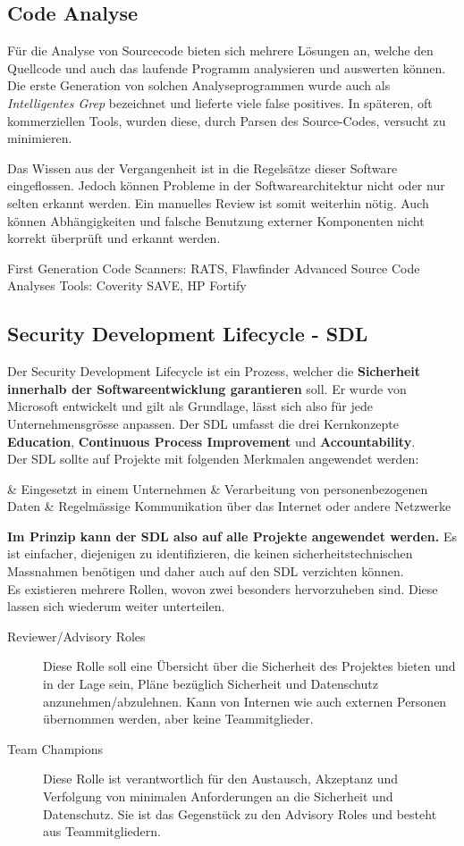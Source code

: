 \subsection{Code Analyse}

Für die Analyse von Sourcecode bieten sich mehrere Lösungen an, welche den Quellcode und auch das laufende Programm analysieren und auswerten können. Die erste Generation von solchen Analyseprogrammen wurde auch als \textit{Intelligentes Grep} bezeichnet und lieferte viele false positives. In späteren, oft kommerziellen Tools, wurden diese, durch Parsen des Source-Codes, versucht zu minimieren.

Das Wissen aus der Vergangenheit ist in die Regelsätze dieser Software eingeflossen. Jedoch können Probleme in der Softwarearchitektur nicht oder nur selten erkannt werden. Ein manuelles Review ist somit weiterhin nötig. Auch können Abhängigkeiten und falsche Benutzung externer Komponenten nicht korrekt überprüft und erkannt werden.

First Generation Code Scanners: RATS, Flawfinder
Advanced Source Code Analyses Tools: Coverity SAVE, HP Fortify

\subsection{Security Development Lifecycle - SDL}

Der Security Development Lifecycle ist ein Prozess, welcher die \textbf{Sicherheit innerhalb der Softwareentwicklung garantieren} soll. Er wurde von Microsoft entwickelt und gilt als Grundlage, lässt sich also für jede Unternehmensgrösse anpassen. Der SDL umfasst die drei Kernkonzepte \textbf{Education}, \textbf{Continuous Process Improvement} und \textbf{Accountability}.\\
Der SDL sollte auf Projekte mit folgenden Merkmalen angewendet werden:
\begin{easylist}[itemize]
	& Eingesetzt in einem Unternehmen
	& Verarbeitung von personenbezogenen Daten
	& Regelmässige Kommunikation über das Internet oder andere Netzwerke
\end{easylist}
\textbf{Im Prinzip kann der SDL also auf alle Projekte angewendet werden.} Es ist einfacher, diejenigen zu identifizieren, die keinen sicherheitstechnischen Massnahmen benötigen und daher auch auf den SDL verzichten können.\\
Es existieren mehrere Rollen, wovon zwei besonders hervorzuheben sind. Diese lassen sich wiederum weiter unterteilen.
\begin{description}
	\item[Reviewer/Advisory Roles] Diese Rolle soll eine Übersicht über die Sicherheit des Projektes bieten und in der Lage sein, Pläne bezüglich Sicherheit und Datenschutz anzunehmen/abzulehnen. Kann von Internen wie auch externen Personen übernommen werden, aber keine Teammitglieder.
	\item[Team Champions] Diese Rolle ist verantwortlich für den Austausch, Akzeptanz und Verfolgung von minimalen Anforderungen an die Sicherheit und Datenschutz. Sie ist das Gegenstück zu den Advisory Roles und besteht aus Teammitgliedern.
\end{description}

